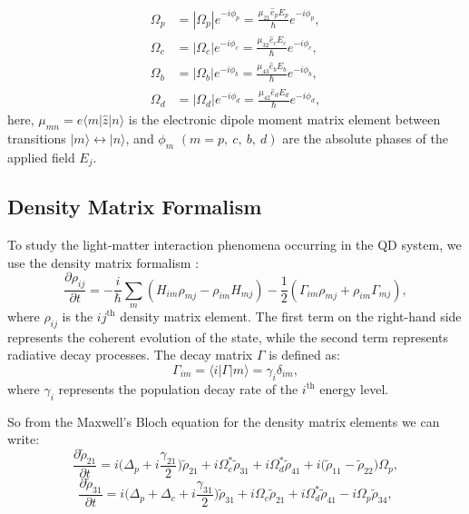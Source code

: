 \documentclass[12pt,a4paper]{article}
\begin{document}
\begin{align}
    \Omega_p &=|\Omega_p|e^{-i\phi_p}=\frac{\mu_{21}\hat{e}_pE_p}{\hbar}e^{-i\phi_p},\\
    \Omega_c &=|\Omega_c|e^{-i\phi_c}=\frac{\mu_{32}\hat{e}_cE_c}{\hbar}e^{-i\phi_c},\\
    \Omega_b &=|\Omega_b|e^{-i\phi_b}=\frac{\mu_{43}\hat{e}_bE_b}{\hbar}e^{-i\phi_b},\\
    \Omega_d &=|\Omega_d|e^{-i\phi_d}=\frac{\mu_{42}\hat{e}_dE_d}{\hbar}e^{-i\phi_d},
\end{align}
here, \(\mu_{mn}=e\langle m|\hat{z}|n\rangle\) is the electronic dipole moment matrix element between transitions \(|m\rangle\leftrightarrow |n\rangle\), and \(\phi_m\) \((m = p,\ c,\ b,\ d)\) are the absolute phases of the applied field \(E_j\).

\subsection{Density Matrix Formalism}
To study the light-matter interaction phenomena occurring in the QD system, we use the density matrix formalism \cite{BOYD2008135}:
\begin{equation}
    \frac{\partial \rho_{ij}}{\partial t} = -\frac{i}{\hbar} \sum_m \left( H_{im} \rho_{mj} - \rho_{im} H_{mj} \right) - \frac{1}{2} \left( \Gamma_{im} \rho_{mj} + \rho_{im} \Gamma_{mj} \right),
\end{equation}
where \(\rho_{ij}\) is the \(ij^{\text{th}}\) density matrix element. The first term on the right-hand side represents the coherent evolution of the state, while the second term represents radiative decay processes. The decay matrix \(\Gamma\) is defined as:
\begin{equation}
    \Gamma_{im} = \langle i|\Gamma|m\rangle = \gamma_i\delta_{im},
\end{equation}
where $\gamma_i$ represents the population decay rate of the $i^{\text{th}}$ energy level.\par
So from the Maxwell’s Bloch equation for the density matrix elements we can write:
\begin{equation}
    \frac{\partial\tilde\rho_{21}}{\partial t} = i\big(\Delta_p+i\frac{\gamma_{21}}{2}\big)\tilde{\rho}_{21}+i\Omega_c^*\tilde{\rho}_{31}+i\Omega_d^*\tilde{\rho}_{41}+i\big(\tilde{\rho}_{11}-\tilde{\rho}_{22}\big)\Omega_p,
\end{equation}
\begin{equation}
    \frac{\partial\tilde{\rho}_{31}}{\partial t}=i\big(\Delta_p+\Delta_c+i\frac{\gamma_{31}}{2}\big)\tilde{\rho}_{31}+i\Omega_c\tilde{\rho}_{21}+i\Omega_d^*\tilde{\rho}_{41}-i\Omega_p\tilde{\rho}_{34},
\end{equation}
\end{document}
